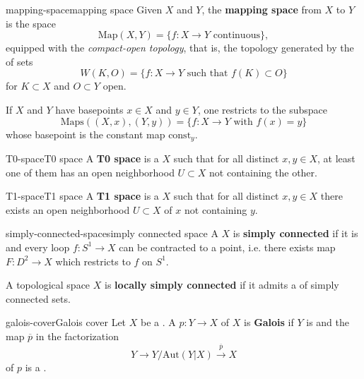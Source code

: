 \begin{topic}{mapping-space}{mapping space}
    Given  $X$ and $Y$, the \textbf{mapping space} from $X$ to $Y$ is the space
    \[ \text{Map}(X, Y) = \{ f : X \to Y \text{ continuous} \} , \]
    equipped with the \textit{compact-open topology}, that is, the topology generated by the  of sets
    \[ W(K, O) = \{ f : X \to Y \text{ such that } f(K) \subset O \} \]
    for $K \subset X$  and $O \subset Y$ open.
    
    If $X$ and $Y$ have basepoints $x \in X$ and $y \in Y$, one restricts to the subspace
    \[ \text{Maps}((X, x), (Y, y)) = \{ f : X \to Y \text{ with } f(x) = y \} \]
    whose basepoint is the constant map $\text{const}_y$.
\end{topic}

\begin{topic}{T0-space}{T0 space}
    A \textbf{T0 space} is a  $X$ such that for all distinct $x, y \in X$, at least one of them has an open neighborhood $U \subset X$ not containing the other.
\end{topic}

\begin{topic}{T1-space}{T1 space}
    A \textbf{T1 space} is a  $X$ such that for all distinct $x, y \in X$ there exists an open neighborhood $U \subset X$ of $x$ not containing $y$.
\end{topic}

\begin{topic}{simply-connected-space}{simply connected space}
    A  $X$ is \textbf{simply connected} if it is  and every loop $f : S^1 \to X$ can be contracted to a point, i.e. there exists map $F : D^2 \to X$ which restricts to $f$ on $S^1$.
    
    A topological space $X$ is \textbf{locally simply connected} if it admits a  of simply connected sets.
\end{topic}

\begin{topic}{galois-cover}{Galois cover}
    Let $X$ be a . A  $p : Y \to X$ of $X$ is \textbf{Galois} if $Y$ is  and the map $\overline{p}$ in the factorization
    \[ Y \to Y / \text{Aut}(Y|X) \xrightarrow{\overline{p}} X \]
    of $p$ is a .
\end{topic}

